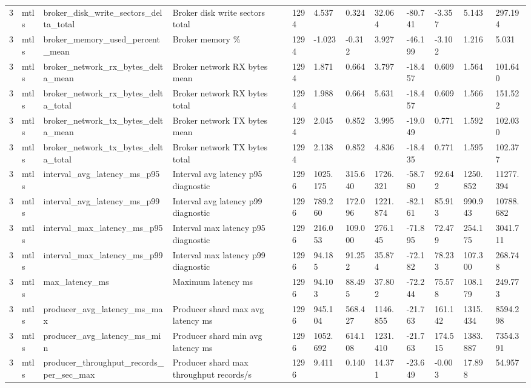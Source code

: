\begin{longtable}{llllllllllll}
3 & mtls & broker\_disk\_write\_sectors\_delta\_total & Broker disk write sectors total & 1294 & 4.537 & 0.324 & 32.064 & -80.741 & -3.357 & 5.143 & 297.194 \\
3 & mtls & broker\_memory\_used\_percent\_mean & Broker memory \% & 1294 & -1.023 & -0.312 & 3.927 & -46.199 & -3.102 & 1.216 & 5.031 \\
3 & mtls & broker\_network\_rx\_bytes\_delta\_mean & Broker network RX bytes mean & 1294 & 1.871 & 0.664 & 3.797 & -18.457 & 0.609 & 1.564 & 101.640 \\
3 & mtls & broker\_network\_rx\_bytes\_delta\_total & Broker network RX bytes total & 1294 & 1.988 & 0.664 & 5.631 & -18.457 & 0.609 & 1.566 & 151.522 \\
3 & mtls & broker\_network\_tx\_bytes\_delta\_mean & Broker network TX bytes mean & 1294 & 2.045 & 0.852 & 3.995 & -19.049 & 0.771 & 1.592 & 102.030 \\
3 & mtls & broker\_network\_tx\_bytes\_delta\_total & Broker network TX bytes total & 1294 & 2.138 & 0.852 & 4.836 & -18.435 & 0.771 & 1.595 & 102.377 \\
3 & mtls & interval\_avg\_latency\_ms\_p95 & Interval avg latency p95 diagnostic & 1296 & 1025.175 & 315.640 & 1726.321 & -58.780 & 92.642 & 1250.852 & 11277.394 \\
3 & mtls & interval\_avg\_latency\_ms\_p99 & Interval avg latency p99 diagnostic & 1296 & 789.260 & 172.096 & 1221.874 & -82.161 & 85.913 & 990.943 & 10788.682 \\
3 & mtls & interval\_max\_latency\_ms\_p95 & Interval max latency p95 diagnostic & 1296 & 216.053 & 109.000 & 276.145 & -71.895 & 72.479 & 254.175 & 3041.711 \\
3 & mtls & interval\_max\_latency\_ms\_p99 & Interval max latency p99 diagnostic & 1296 & 94.185 & 91.252 & 35.874 & -72.182 & 78.233 & 107.300 & 268.748 \\
3 & mtls & max\_latency\_ms & Maximum latency ms & 1296 & 94.103 & 88.495 & 37.802 & -72.244 & 75.578 & 108.179 & 249.773 \\
3 & mtls & producer\_avg\_latency\_ms\_max & Producer shard max avg latency ms & 1296 & 945.104 & 568.427 & 1146.855 & -21.763 & 161.142 & 1315.434 & 8594.298 \\
3 & mtls & producer\_avg\_latency\_ms\_min & Producer shard min avg latency ms & 1296 & 1052.692 & 614.108 & 1231.410 & -21.763 & 174.515 & 1383.887 & 7354.391 \\
3 & mtls & producer\_throughput\_records\_per\_sec\_max & Producer shard max throughput records/s & 1296 & 9.411 & 0.140 & 14.371 & -23.649 & -0.003 & 17.898 & 54.957 \\

\end{longtable}
